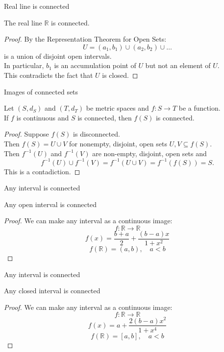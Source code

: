 \documentclass{beamer}
\begin{document}
\begin{frame}{Real line is connected}
\begin{thm}
The real line $\mathbb{R}$ is connected.
\end{thm}
\pause
\begin{proof}
\pause
By the Representation Theorem for Open Sets:
\pause
$$U = (a_1,b_1)\cup (a_2,b_2)\cup\dots $$
\pause
is a union of disjoint open intervals.\\
\pause
In particular, $b_1$ is an accumulation point of $U$ but not an element of $U$.\\
\pause
This contradicts the fact that $U$ is closed.
\end{proof}
\end{frame}

\begin{frame}{Images of connected sets}
\begin{thm}
Let $(S,d_S)$ and $(T,d_T)$ be metric spaces and $f: S\rightarrow T$ be a function.\\
If $f$ is continuous and $S$ is connected, then $f(S)$ is connected.
\end{thm}
\pause
\begin{proof}
\pause
Suppose $f(S)$ is disconnected.\\
\pause
Then $f(S) = U\cup V$ for nonempty, disjoint, open sets $U,V\subseteq f(S)$.\\
\pause
Then $f^{-1}(U)$ and $f^{-1}(V)$ are non-empty, disjoint, open sets and
$$f^{-1}(U)\cup f^{-1}(V) = f^{-1}(U\cup V) = f^{-1}(f(S)) = S.$$
\pause
This is a contadiction.
\end{proof}
\end{frame}

\begin{frame}{Any interval is connected}
\begin{thm}
Any open interval is connected
\end{thm}
\pause
\begin{proof}
\pause
We can make any interval as a continuous image:
$$f:\mathbb{R}\rightarrow\mathbb{R}$$
$$f(x) = \frac{b+a}{2} + \frac{(b-a)x}{1+x^2}$$
\pause
$$f(\mathbb{R}) = (a,b),\quad a < b$$
\end{proof}
\end{frame}

\begin{frame}{Any interval is connected}
\begin{thm}
Any closed interval is connected
\end{thm}
\pause
\begin{proof}
We can make any interval as a continuous image:
$$f:\mathbb{R}\rightarrow\mathbb{R}$$
$$f(x) = a + \frac{2(b-a)x^2}{1+x^4}$$
\pause
$$f(\mathbb{R}) = [a,b],\quad a < b$$
\end{proof}
\end{frame}
\end{document}
